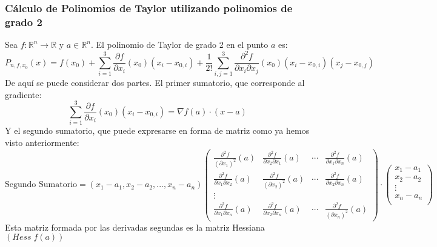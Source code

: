 \documentclass[11pt]{article}
\newcommand{\R}{\mathbb{R}}
\theoremstyle{plain}
\begin{document}
            \subsubsection{Cálculo de Polinomios de Taylor utilizando polinomios de grado 2} %
            \label{subsub:calculo_de_polinomios_de_taylor_utilizando_polinomios_de_grado_2}
                Sea $f:\R^n \rightarrow \R$ y $a\in\R^n$. El polinomio de Taylor de grado 2 en el punto $a$ es:
                \[P_{n,f,x_0}(x) = f(x_0) +  \sum_{i=1}^3 \frac{\partial f}{\partial x_i}(x_0)(x_i-x_{0,i}) + \frac{1}{2!} \sum_{i,j=1}^{3} \frac{\partial^2 f}{\partial x_i\partial x_j}(x_0) (x_i-x_{0,i})(x_j-x_{0,j})\]
                De aquí se puede considerar dos partes. El primer sumatorio, que corresponde al gradiente:
                \[\sum_{i=1}^3 \frac{\partial f}{\partial x_i}(x_0)(x_i-x_{0,i}) = \nabla f(a) \cdot (x-a)\]
                Y el segundo sumatorio, que puede expresarse en forma de matriz como ya hemos visto anteriormente:
                \begin{equation}
                    \text{Segundo Sumatorio} = (x_1-a_1,x_2-a_2,...,x_n-a_n)
                    \begin{pmatrix}
                        \frac{\partial^2 f}{(\partial x_1)^2}(a) & \frac{\partial^2 f}{\partial x_2 \partial x_1}(a) & \cdots & \frac{\partial^2 f}{\partial x_1 \partial x_n}(a)\\
                        \frac{\partial^2 f}{\partial x_1 \partial x_2}(a) & \frac{\partial^2 f}{(\partial x_2)^2}(a) & \cdots & \frac{\partial^2 f}{\partial x_2 \partial x_n}(a)\\
                        \vdots & & & \\
                        \frac{\partial^2 f}{\partial x_1 \partial x_n}(a) & \frac{\partial^2 f}{\partial x_2 \partial x_n}(a) & \cdots & \frac{\partial^2 f}{(\partial x_n)^2}(a)
                    \end{pmatrix}
                    \cdot
                    \begin{pmatrix}
                        x_1-a_1 \\
                        x_2-a_2 \\
                        \vdots \\
                        x_n-a_n \\
                    \end{pmatrix}
                \end{equation}
                Esta matriz formada por las derivadas segundas es la matriz Hessiana $(Hess \; f(a))$
\end{document}
